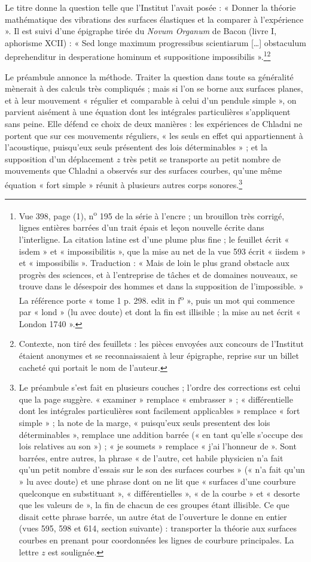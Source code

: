 \documentclass[11pt,a4paper]{article}
\begin{document}
Le titre donne la question telle que l'Institut l'avait posée : « Donner la théorie
mathématique des vibrations des surfaces élastiques et la comparer à
l'expérience ». Il est suivi d'une épigraphe tirée du \emph{Novum Organum} de Bacon
(livre I, aphorisme XCII) : « Sed longe maximum progressibus scientiarum […] obstaculum
deprehenditur in desperatione hominum et suppositione impossibilis ».\footnote{Vue 398,
page (1), n\textsuperscript{o} 195 de la série à l'encre ; un brouillon très corrigé,
lignes entières barrées d'un trait épais et leçon nouvelle écrite dans l'interligne.
La citation latine est d'une plume plus fine ; le feuillet écrit « isdem » et
« impossibilitis », que la mise au net de la vue 593 écrit « iisdem » et
« impossibilis ». Traduction : « Mais de loin le plus grand obstacle aux progrès des
sciences, et à l'entreprise de tâches et de domaines nouveaux, se trouve dans le
désespoir des hommes et dans la supposition de l'impossible. » La référence porte
« tome 1 p. 298. edit in f\textsuperscript{o} », puis un mot qui commence par « lond »
(lu avec doute) et dont la fin est illisible ; la mise au net écrit « London
1740 ».}\footnote{Contexte, non tiré des feuillets : les pièces envoyées aux concours
de l'Institut étaient anonymes et se reconnaissaient à leur épigraphe, reprise sur un
billet cacheté qui portait le nom de l'auteur.}

Le préambule annonce la méthode. Traiter la question dans toute sa généralité
mènerait à des calculs très compliqués ; mais si l'on se borne aux surfaces planes, et
à leur mouvement « régulier et comparable à celui d'un pendule simple », on parvient
aisément à une équation dont les intégrales particulières s'appliquent sans peine.
Elle défend ce choix de deux manières : les expériences de Chladni ne portent que sur
ces mouvements réguliers, « les seuls en effet qui appartiennent à l'acoustique,
puisqu'eux seuls présentent des lois déterminables » ; et la supposition d'un
déplacement $z$ très petit se transporte au petit nombre de mouvements que Chladni a
observés sur des surfaces courbes, qu'une même équation « fort simple » réunit à
plusieurs autres corps sonores.\footnote{Le préambule s'est fait en plusieurs
couches ; l'ordre des corrections est celui que la page suggère. « examiner » remplace
« embrasser » ; « différentielle dont les intégrales particulières sont facilement
applicables » remplace « fort simple » ; la note de la marge, « puisqu'eux seuls
presentent des lois déterminables », remplace une addition barrée (« en tant qu'elle
s'occupe des lois relatives au son ») ; « je soumets » remplace « j'ai l'honneur de ».
Sont barrées, entre autres, la phrase « de l'autre, cet habile physicien n'a fait
qu'un petit nombre d'essais sur le son des surfaces courbes » (« n'a fait qu'un » lu
avec doute) et une phrase dont on ne lit que « surfaces d'une courbure quelconque en
substituant », « différentielles », « de la courbe » et « desorte que les valeurs de »,
la fin de chacun de ces groupes étant illisible. Ce que disait cette phrase barrée, un
autre état de l'ouverture le donne en entier (vues 595, 598 et 614, section suivante) :
transporter la théorie aux surfaces courbes en prenant pour coordonnées les lignes de
courbure principales. La lettre $z$ est soulignée.}
\end{document}
